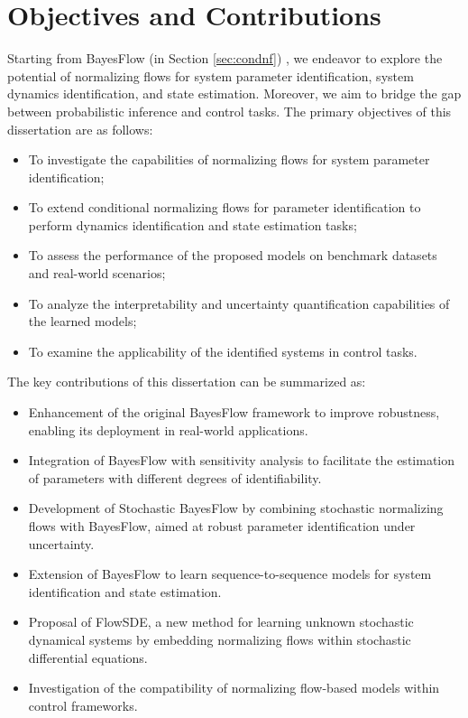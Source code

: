 \section{Objectives and Contributions}
\label{sec:introduction:objectives}
Starting from BayesFlow (in Section \ref{sec:condnf}) \citep{radev2020bayesflow}, we endeavor to explore the potential of normalizing flows for system parameter identification, system dynamics identification, and state estimation. Moreover, we aim to bridge the gap between probabilistic inference and control tasks. 
The primary objectives of this dissertation are as follows:
\begin{itemize}
    \item To investigate the capabilities of normalizing flows for system parameter identification;
    \item To extend conditional normalizing flows for parameter identification to perform dynamics identification and state estimation tasks;
    \item To assess the performance of the proposed models on benchmark datasets and real-world scenarios;
    \item To analyze the interpretability and uncertainty quantification capabilities of the learned models;
    \item To examine the applicability of the identified systems in control tasks.
\end{itemize}
The key contributions of this dissertation can be summarized as:
\begin{itemize}
    \item Enhancement of the original BayesFlow framework to improve robustness, enabling its deployment in real-world applications.
    \item Integration of BayesFlow with sensitivity analysis to facilitate the estimation of parameters with different degrees of identifiability.
    \item Development of Stochastic BayesFlow by combining stochastic normalizing flows with BayesFlow, aimed at robust parameter identification under uncertainty.
    \item Extension of BayesFlow to learn sequence-to-sequence models for system identification and state estimation. 
    \item Proposal of FlowSDE, a new method for learning unknown stochastic dynamical systems by embedding normalizing flows within stochastic differential equations.
    \item Investigation of the compatibility of normalizing flow-based models within control frameworks.
\end{itemize}